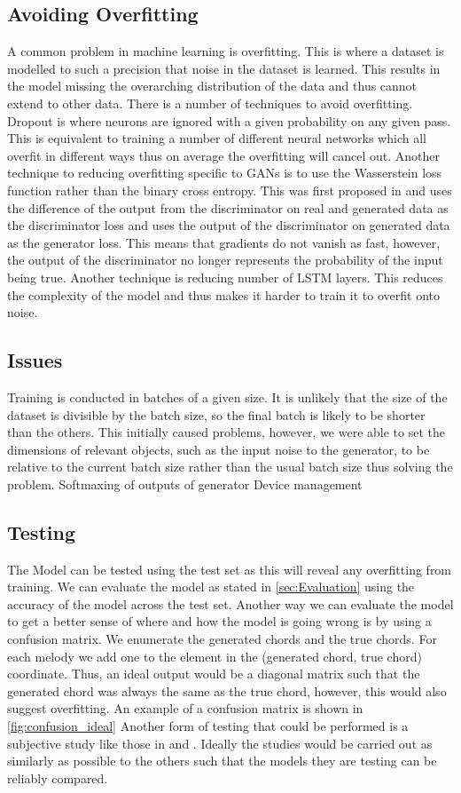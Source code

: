 \subsection{Avoiding Overfitting}
A common problem in machine learning is overfitting. This is where a dataset is modelled to such a precision that noise in the dataset is learned.
This results in the model missing the overarching distribution of the data and thus cannot extend to other data.
There is a number of techniques to avoid overfitting.
Dropout is where neurons are ignored with a given probability on any given pass. 
This is equivalent to training a number of different neural networks which all overfit in different ways thus on average the overfitting will cancel out.
Another technique to reducing overfitting specific to GANs is to use the Wasserstein loss function rather than the binary cross entropy. 
This was first proposed in \cite{Wasserstein} and uses the difference of the output from the discriminator on real and generated data as the discriminator loss and uses the output of the discriminator on generated data as the generator loss.
This means that gradients do not vanish as fast, however, the output of the discriminator no longer represents the probability of the input being true.
Another technique is reducing number of LSTM layers. 
This reduces the complexity of the model and thus makes it harder to train it to overfit onto noise.

\subsection{Issues}
Training is conducted in batches of a given size.
It is unlikely that the size of the dataset is divisible by the batch size, so the final batch is likely to be shorter than the others.
This initially caused problems, however, we were able to set the dimensions of relevant objects, such as the input noise to the generator, to be relative to the current batch size rather than the usual batch size thus solving the problem.
Softmaxing of outputs of generator
Device management

\subsection{Testing}
The Model can be tested using the test set as this will reveal any overfitting from training. 
We can evaluate the model as stated in \autoref{sec:Evaluation} using the accuracy of the model across the test set.
Another way we can evaluate the model to get a better sense of where and how the model is going wrong is by using a confusion matrix.
We enumerate the generated chords and the true chords. 
For each melody we add one to the element in the (generated chord, true chord) coordinate. 
Thus, an ideal output would be a diagonal matrix such that the generated chord was always the same as the true chord, however, this would also suggest overfitting.
An example of a confusion matrix is shown in \autoref{fig:confusion_ideal}
Another form of testing that could be performed is a subjective study like those in \cite{MySong} and \cite{BLSTM}.
Ideally the studies would be carried out as similarly as possible to the others such that the models they are testing can be reliably compared.

